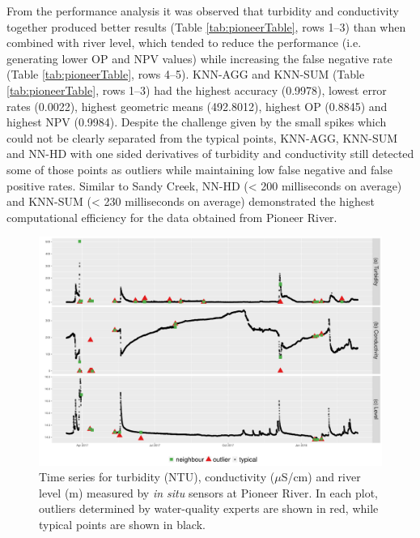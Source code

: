 \documentclass[draft]{agujournal2018} %
\begin{document}
From the performance analysis it was observed that turbidity and
conductivity together produced better results (Table
\ref{tab:pioneerTable}, rows 1--3) than when combined with river level, which
tended to reduce the performance (i.e. generating lower OP and NPV values) while increasing the
false negative rate (Table \ref{tab:pioneerTable}, rows 4--5). KNN-AGG and
KNN-SUM (Table \ref{tab:pioneerTable}, rows 1--3) had the highest
accuracy (0.9978), lowest error rates (0.0022), highest geometric means (492.8012), highest OP (0.8845) and highest NPV (0.9984). Despite the challenge given by the small spikes which could not be clearly separated from the typical points, KNN-AGG, KNN-SUM and \color{black} NN-HD \color{black} with one sided
derivatives of turbidity and conductivity still detected some of those
points as outliers while maintaining low false negative and false
positive rates. Similar to Sandy Creek, \color{black} NN-HD \color{black} (\textless{} 200
milliseconds on average) and KNN-SUM (\textless{} 230 milliseconds on
average) demonstrated the highest computational efficiency for the data
obtained from Pioneer River.

\begin{figure}[H]

{\centering \includegraphics[width=1\textwidth]{./fig/transdemoTCLPioneerOriginal-1.pdf}

}

\caption{Time series for turbidity (NTU), conductivity ($\mu$S/cm) and river level (m) measured by \textit{in situ} sensors at Pioneer River. In each plot, outliers determined by water-quality experts are shown in red, while typical points are shown in black.}\label{fig:VisualiseOutlierPioneerpng}
\end{figure}
\end{document}
